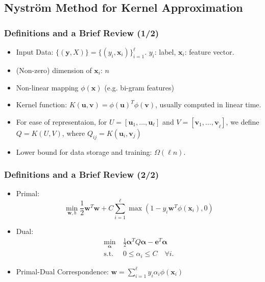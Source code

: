 \documentclass{beamer}
\def\bw{{\boldsymbol w}}
\def\bu{{\boldsymbol u}}
\def\balpha{{\boldsymbol \alpha}}
\def\be{{\boldsymbol e}}
\def\bx{{\boldsymbol x}}
\def\by{{\boldsymbol y}}
\def\bv{{\boldsymbol v}}
\begin{document}
\subsection{Nystr\"om Method for Kernel Approximation}
\begin{frame}
  \frametitle{Definitions and a Brief Review (1/2)}
  \begin{itemize}
    \item Input Data: $\{(\by, X)\} = \{(y_i, \bx_i)\}_{i=1}^\ell$. $y_i$: label, $\bx_i$: feature vector.
    \item (Non-zero) dimension of $\bx_i$: $n$
    \item Non-linear mapping $\phi(\bx)$ (e.g. bi-gram features)
    \item Kernel function: $K(\bu, \bv) = \phi(\bu)^T \phi(\bv)$, usually computed in linear time.
    \item For ease of representaion, for $U = [\bu_1, \dots, \bu_\ell]$ and $V = [\bv_1, \dots, \bv_{\tilde{\ell}}]$, we define $Q = K(U, V)$, where $Q_{ij} = K(\bu_i, \bv_j)$
    \pause
    \item Lower bound for data storage and training: $\Omega(\ell n)$.
  \end{itemize}
\end{frame}

\begin{frame}
  \frametitle{Definitions and a Brief Review (2/2)}
  \begin{itemize}
    \item Primal:
    \begin{equation}
      \min_{\bw, b}
      \frac{1}{2} \bw^T\bw + C\sum_{i=1}^\ell \max(1-y_i\bw^T\phi(\bx_i), 0) \nonumber
    \end{equation} 
    \item Dual: 
    \begin{align}
    \min_{\balpha} \  &  \frac{1}{2} \balpha^T Q  \balpha - \be^T \balpha \nonumber \\
    \mbox{s.t.} \  & 0 \le \alpha_i \le C \quad \forall i \mbox{.} \nonumber
    \end{align}
    \item Primal-Dual Correspondence: $\bw = \sum_{i=1}^\ell y_i \alpha_i \phi(\bx_i)$ 
  \end{itemize}
\end{frame}
\end{document}
